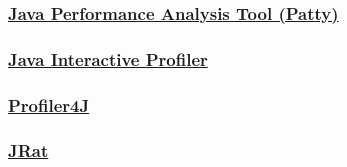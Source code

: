 

\subsubsection{\href{http://patty.sourceforge.net/}{Java Performance Analysis Tool (Patty)}}



\subsubsection{\href{http://jiprof.sourceforge.net/}{Java Interactive Profiler}}



\subsubsection{\href{http://profiler4j.sourceforge.net/}{Profiler4J}}



\subsubsection{\href{http://jrat.sourceforge.net/}{JRat}}

